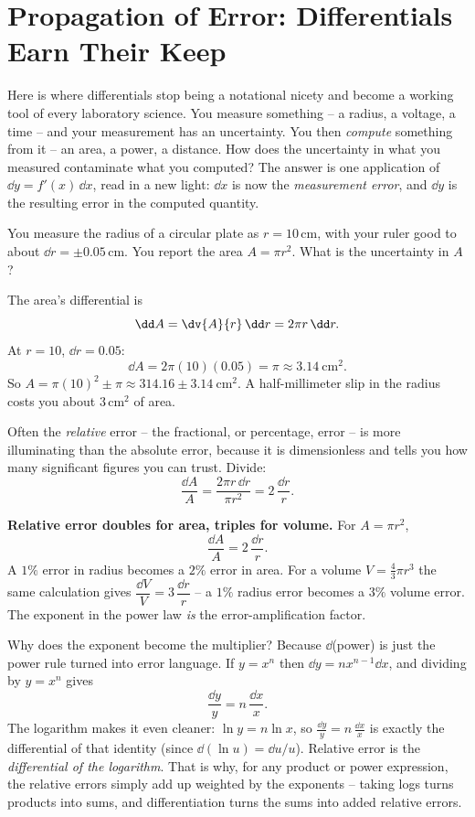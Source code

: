 \section{Propagation of Error: Differentials Earn Their Keep}
\label{ch14:propagation}

Here is where differentials stop being a notational nicety and become a working
tool of every laboratory science. You measure something -- a radius, a voltage, a
time -- and your measurement has an uncertainty. You then \emph{compute} something
from it -- an area, a power, a distance. How does the uncertainty in what you
measured contaminate what you computed? The answer is one application of
$\dd y = f'(x)\,\dd x$, read in a new light: $\dd x$ is now the \emph{measurement
error}, and $\dd y$ is the resulting error in the computed quantity.

\begin{example}
\label{ch14:ex-circle}
You measure the radius of a circular plate as $r = 10\,$cm, with your ruler good
to about $\dd r = \pm 0.05\,$cm. You report the area $A=\pi r^2$. What is the
uncertainty in $A$?

The area's differential is
\[
\dd A = \dv{A}{r}\,\dd r = 2\pi r\,\dd r.
\]
At $r=10$, $\dd r = 0.05$:
\[
\dd A = 2\pi (10)(0.05) = \pi \approx 3.14\ \text{cm}^2.
\]
So $A = \pi(10)^2 \pm \pi \approx 314.16 \pm 3.14\ \text{cm}^2$. A half-millimeter
slip in the radius costs you about $3\,$cm$^2$ of area.
\end{example}

Often the \emph{relative} error -- the fractional, or percentage, error -- is more
illuminating than the absolute error, because it is dimensionless and tells you
how many significant figures you can trust. Divide:
\[
\frac{\dd A}{A} = \frac{2\pi r\,\dd r}{\pi r^2} = 2\,\frac{\dd r}{r}.
\]

\begin{focusbox}
\textbf{Relative error doubles for area, triples for volume.} For $A = \pi r^2$,
\[
\frac{\dd A}{A} = 2\,\frac{\dd r}{r}.
\]
A $1\%$ error in radius becomes a $2\%$ error in area. For a volume $V = \tfrac43
\pi r^3$ the same calculation gives $\dfrac{\dd V}{V} = 3\,\dfrac{\dd r}{r}$ -- a
$1\%$ radius error becomes a $3\%$ volume error. The exponent in the power law
\emph{is} the error-amplification factor.
\end{focusbox}

\begin{whybox}
Why does the exponent become the multiplier? Because $\dd$(power) is just the
power rule turned into error language. If $y = x^n$ then $\dd y = n x^{n-1}\dd x$,
and dividing by $y=x^n$ gives
\[
\frac{\dd y}{y} = n\,\frac{\dd x}{x}.
\]
The logarithm makes it even cleaner: $\ln y = n\ln x$, so $\frac{\dd y}{y} =
n\,\frac{\dd x}{x}$ is exactly the differential of that identity (since
$\dd(\ln u) = \dd u/u$). Relative error is the \emph{differential of the
logarithm}. That is why, for any product or power expression, the relative errors
simply add up weighted by the exponents -- taking logs turns products into sums,
and differentiation turns the sums into added relative errors.
\end{whybox}

